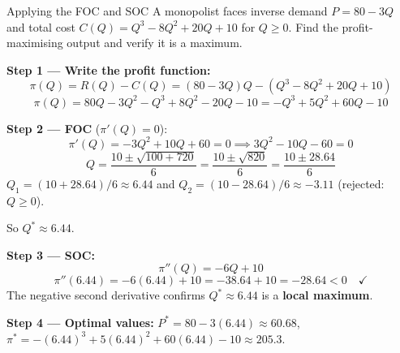 \documentclass[12pt, a4paper]{article}
\theoremstyle{definition}
\begin{document}
\begin{exbox}{Applying the FOC and SOC}
A monopolist faces inverse demand $P = 80 - 3Q$ and total cost
$C(Q) = Q^3 - 8Q^2 + 20Q + 10$ for $Q \geq 0$.
Find the profit-maximising output and verify it is a maximum.

\textbf{Step 1 --- Write the profit function:}
\[
  \pi(Q) = R(Q) - C(Q) = (80-3Q)Q - (Q^3-8Q^2+20Q+10)
\]
\[
  \pi(Q) = 80Q - 3Q^2 - Q^3 + 8Q^2 - 20Q - 10
         = -Q^3 + 5Q^2 + 60Q - 10
\]

\textbf{Step 2 --- FOC} ($\pi'(Q)=0$):
\[
  \pi'(Q) = -3Q^2 + 10Q + 60 = 0
  \implies 3Q^2 - 10Q - 60 = 0
\]
\[
  Q = \frac{10 \pm \sqrt{100 + 720}}{6}
    = \frac{10 \pm \sqrt{820}}{6}
    = \frac{10 \pm 28.64}{6}
\]
$Q_1 = (10+28.64)/6 \approx 6.44$ \quad and \quad
$Q_2 = (10-28.64)/6 \approx -3.11$ (rejected: $Q \geq 0$).

So $Q^* \approx 6.44$.

\textbf{Step 3 --- SOC:}
\[
  \pi''(Q) = -6Q + 10
\]
\[
  \pi''(6.44) = -6(6.44)+10 = -38.64+10 = -28.64 < 0 \quad \checkmark
\]
The negative second derivative confirms $Q^* \approx 6.44$ is a
\textbf{local maximum}.

\textbf{Step 4 --- Optimal values:}
$P^* = 80-3(6.44) \approx 60.68$, \quad
$\pi^* = -(6.44)^3+5(6.44)^2+60(6.44)-10 \approx 205.3$.
\end{exbox}
\end{document}
